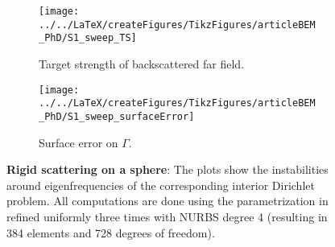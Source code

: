 \begin{figure}
	\centering
	\begin{subfigure}[t]{\textwidth}
		\texttt{[image: ../../LaTeX/createFigures/TikzFigures/articleBEM\_PhD/S1\_sweep\_TS]}
		\caption{Target strength of backscattered far field.}
		\label{Fig3:eigenFreqDirichlet}
	\end{subfigure} 
	\par\bigskip
	\par\bigskip
	\begin{subfigure}[t]{\textwidth}
		\texttt{[image: ../../LaTeX/createFigures/TikzFigures/articleBEM\_PhD/S1\_sweep\_surfaceError]}
		\caption{Surface error on $\Gamma$.}
		\label{Fig3:eigenFreqDirichletError}
	\end{subfigure} 
	\caption{\textbf{Rigid scattering on a sphere}: The plots show the instabilities around eigenfrequencies of the corresponding interior Dirichlet problem. All computations are done using the parametrization in  refined uniformly three times with NURBS degree 4 (resulting in 384 elements and 728 degrees of freedom).}
\end{figure}


